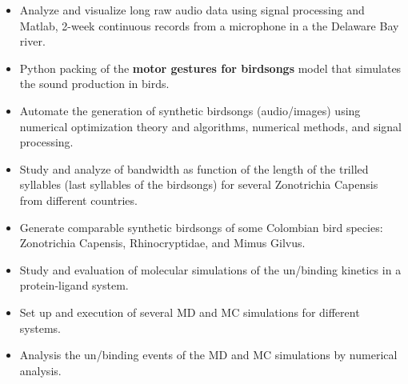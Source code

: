 \documentclass[10pt,letter,ragged2e,withhyper]{altacv}
\begin{document}
\begin{paracol}{2}


\begin{itemize}
\item Analyze and visualize long raw audio data using signal processing and Matlab, 2-week continuous records from a microphone in a the Delaware Bay river.
\end{itemize}




\begin{itemize}
\item Python packing of the \textbf{motor gestures for birdsongs} model that simulates the sound production in birds.
\item Automate the generation of synthetic birdsongs (audio/images) using numerical optimization theory and algorithms, numerical methods, and signal processing.
\item Study and analyze of bandwidth as function of the length of the trilled syllables (last syllables of the birdsongs) for several Zonotrichia Capensis from different countries.
\item Generate comparable synthetic birdsongs of some Colombian bird species: Zonotrichia Capensis, Rhinocryptidae, and Mimus Gilvus.

\end{itemize}

\divider

\begin{itemize}
\item Study and evaluation of molecular simulations of the un/binding kinetics in a protein-ligand system.
\item Set up and execution of several MD and MC simulations for different systems.
\item Analysis the un/binding events of the MD and MC simulations by numerical analysis.
\end{itemize}


\end{paracol}
\end{document}
